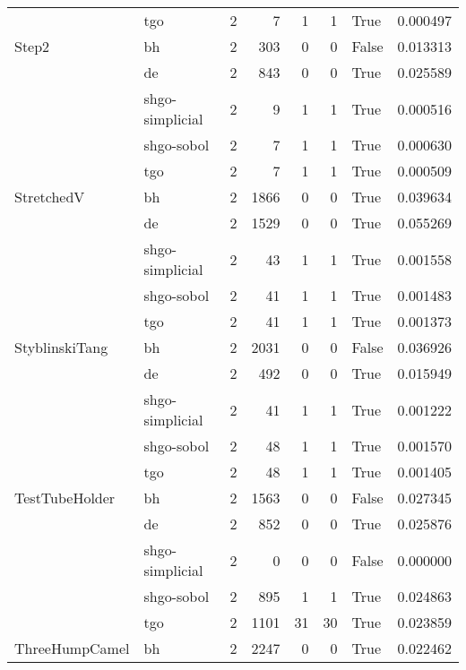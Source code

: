 \begin{longtable}{llrrrrlr}
         & tgo &     2 &        7 &      1 &       1 &    True &    0.000497 \\
Step2 & bh &     2 &      303 &      0 &       0 &   False &    0.013313 \\
         & de &     2 &      843 &      0 &       0 &    True &    0.025589 \\
         & shgo-simplicial &     2 &        9 &      1 &       1 &    True &    0.000516 \\
         & shgo-sobol &     2 &        7 &      1 &       1 &    True &    0.000630 \\
         & tgo &     2 &        7 &      1 &       1 &    True &    0.000509 \\
StretchedV & bh &     2 &     1866 &      0 &       0 &    True &    0.039634 \\
         & de &     2 &     1529 &      0 &       0 &    True &    0.055269 \\
         & shgo-simplicial &     2 &       43 &      1 &       1 &    True &    0.001558 \\
         & shgo-sobol &     2 &       41 &      1 &       1 &    True &    0.001483 \\
         & tgo &     2 &       41 &      1 &       1 &    True &    0.001373 \\
StyblinskiTang & bh &     2 &     2031 &      0 &       0 &   False &    0.036926 \\
         & de &     2 &      492 &      0 &       0 &    True &    0.015949 \\
         & shgo-simplicial &     2 &       41 &      1 &       1 &    True &    0.001222 \\
         & shgo-sobol &     2 &       48 &      1 &       1 &    True &    0.001570 \\
         & tgo &     2 &       48 &      1 &       1 &    True &    0.001405 \\
TestTubeHolder & bh &     2 &     1563 &      0 &       0 &   False &    0.027345 \\
         & de &     2 &      852 &      0 &       0 &    True &    0.025876 \\
         & shgo-simplicial &     2 &        0 &      0 &       0 &   False &    0.000000 \\
         & shgo-sobol &     2 &      895 &      1 &       1 &    True &    0.024863 \\
         & tgo &     2 &     1101 &     31 &      30 &    True &    0.023859 \\
ThreeHumpCamel & bh &     2 &     2247 &      0 &       0 &    True &    0.022462 \\

\end{longtable}

